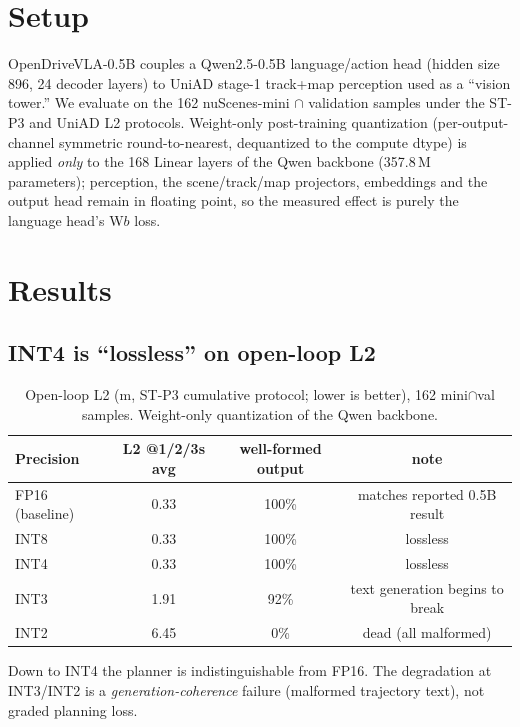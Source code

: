 \documentclass[conference]{IEEEtran}
\begin{document}
\section{Setup}
OpenDriveVLA-0.5B couples a Qwen2.5-0.5B language/action head (hidden size 896, 24 decoder
layers) to UniAD stage-1 track+map perception used as a ``vision tower.'' We evaluate on the
162 nuScenes-mini $\cap$ validation samples under the ST-P3 and UniAD L2 protocols. Weight-only
post-training quantization (per-output-channel symmetric round-to-nearest, dequantized to the
compute dtype) is applied \emph{only} to the 168 Linear layers of the Qwen backbone (357.8\,M
parameters); perception, the scene/track/map projectors, embeddings and the output head remain
in floating point, so the measured effect is purely the language head's W$b$ loss.

\section{Results}
\subsection{INT4 is ``lossless'' on open-loop L2}
\begin{table}[t]\centering
\caption{Open-loop L2 (m, ST-P3 cumulative protocol; lower is better), 162 mini$\cap$val samples.
Weight-only quantization of the Qwen backbone.}
\begin{tabular}{lccc}
\toprule
Precision & L2 @1/2/3s avg & well-formed output & note \\
\midrule
FP16 (baseline) & 0.33 & 100\% & matches reported 0.5B result \\
INT8            & 0.33 & 100\% & lossless \\
INT4            & 0.33 & 100\% & lossless \\
INT3            & 1.91 & 92\%  & text generation begins to break \\
INT2            & 6.45 & 0\%   & dead (all malformed) \\
\bottomrule
\end{tabular}
\end{table}
Down to INT4 the planner is indistinguishable from FP16. The degradation at INT3/INT2 is a
\emph{generation-coherence} failure (malformed trajectory text), not graded planning loss.
\end{document}

